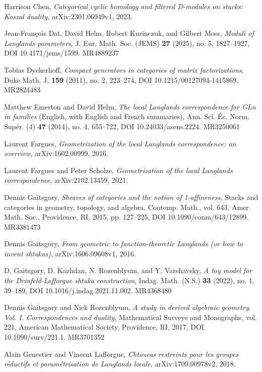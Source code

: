 \begin{refs}
\item[{[Ch23]}] Harrison Chen, \emph{Categorical cyclic homology and filtered D-modules on stacks: Koszul duality}, arXiv:2301.06949v1, 2023.
\item[{[DHKM20]}] Jean-Fran\c{c}ois Dat, David Helm, Robert Kurinczuk, and Gilbert Moss, \emph{Moduli of Langlands parameters}, J. Eur. Math. Soc. (JEMS) \textbf{27} (2025), no. 5, 1827--1927, DOI 10.4171/jems/1599. MR4889237
\item[{[Dy11]}] Tobias Dyckerhoff, \emph{Compact generators in categories of matrix factorizations}, Duke Math. J. \textbf{159} (2011), no. 2, 223--274, DOI 10.1215/00127094-1415869. MR2824483
\item[{[EH14]}] Matthew Emerton and David Helm, \emph{The local Langlands correspondence for GLn in families} (English, with English and French summaries), Ann. Sci. \'Ec. Norm. Sup\'er. (4) \textbf{47} (2014), no. 4, 655--722, DOI 10.24033/asens.2224. MR3250061
\item[{[Fa16]}] Laurent Fargues, \emph{Geometrization of the local Langlands correspondence: an overview}, arXiv:1602.00999, 2016.
\item[{[FS21]}] Laurent Fargues and Peter Scholze, \emph{Geometrization of the local Langlands correspondence}, arXiv:2102.13459, 2021.
\item[{[Ga14]}] Dennis Gaitsgory, \emph{Sheaves of categories and the notion of 1-affineness}, Stacks and categories in geometry, topology, and algebra, Contemp. Math., vol. 643, Amer. Math. Soc., Providence, RI, 2015, pp. 127--225, DOI 10.1090/conm/643/12899. MR3381473
\item[{[Ga16]}] Dennis Gaitsgory, \emph{From geometric to function-theoretic Langlands (or how to invent shtukas)}, arXiv:1606.09608v1, 2016.
\item[{[GKRV20]}] D. Gaitsgory, D. Kazhdan, N. Rozenblyum, and Y. Varshavsky, \emph{A toy model for the Drinfeld-Lafforgue shtuka construction}, Indag. Math. (N.S.) \textbf{33} (2022), no. 1, 39--189, DOI 10.1016/j.indag.2021.11.002. MR4368480
\item[{[GR17]}] Dennis Gaitsgory and Nick Rozenblyum, \emph{A study in derived algebraic geometry. Vol. I. Correspondences and duality}, Mathematical Surveys and Monographs, vol. 221, American Mathematical Society, Providence, RI, 2017, DOI 10.1090/surv/221.1. MR3701352
\item[{[GL18]}] Alain Genestier and Vincent Lafforgue, \emph{Chtoucas restreints pour les groupes r\'eductifs et param\'etrisation de Langlands locale}, arXiv:1709.00978v2, 2018.


\end{refs}
